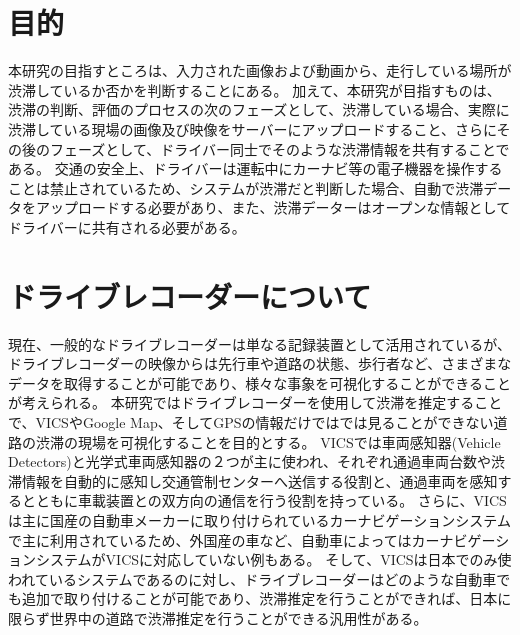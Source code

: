 \section{目的}
本研究の目指すところは、入力された画像および動画から、走行している場所が渋滞しているか否かを判断することにある。
加えて、本研究が目指すものは、渋滞の判断、評価のプロセスの次のフェーズとして、渋滞している場合、実際に渋滞している現場の画像及び映像をサーバーにアップロードすること、さらにその後のフェーズとして、ドライバー同士でそのような渋滞情報を共有することである。
交通の安全上、ドライバーは運転中にカーナビ等の電子機器を操作することは禁止されているため、システムが渋滞だと判断した場合、自動で渋滞データをアップロードする必要があり、また、渋滞データーはオープンな情報としてドライバーに共有される必要がある。

\section{ドライブレコーダーについて}
現在、一般的なドライブレコーダーは単なる記録装置として活用されているが、ドライブレコーダーの映像からは先行車や道路の状態、歩行者など、さまざまなデータを取得することが可能であり、様々な事象を可視化することができることが考えられる。
本研究ではドライブレコーダーを使用して渋滞を推定することで、VICSやGoogle Map、そしてGPSの情報だけではでは見ることができない道路の渋滞の現場を可視化することを目的とする。
VICSでは車両感知器(Vehicle Detectors)と光学式車両感知器の２つが主に使われ、それぞれ通過車両台数や渋滞情報を自動的に感知し交通管制センターへ送信する役割と、通過車両を感知するとともに車載装置との双方向の通信を行う役割を持っている。
さらに、VICSは主に国産の自動車メーカーに取り付けられているカーナビゲーションシステムで主に利用されているため、外国産の車など、自動車によってはカーナビゲーションシステムがVICSに対応していない例もある。
そして、VICSは日本でのみ使われているシステムであるのに対し、ドライブレコーダーはどのような自動車でも追加で取り付けることが可能であり、渋滞推定を行うことができれば、日本に限らず世界中の道路で渋滞推定を行うことができる汎用性がある。


